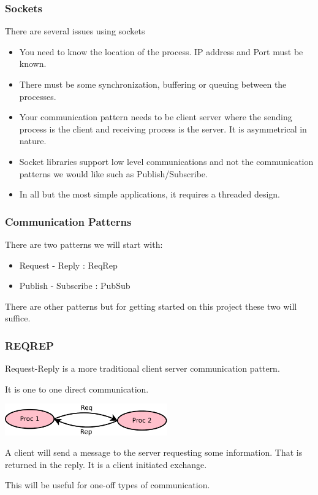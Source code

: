 \documentclass[xcolor=svgnames]{beamer}
\begin{document}
\begin{frame}[fragile]
\frametitle{Sockets}
  
There are several issues using sockets
\begin{itemize}
\item You need to know the location of the process. IP address and Port
must be known.  
\item There must be some synchronization, buffering or queuing between the processes.
\item Your communication pattern needs to be client server where the 
sending process is the client and receiving process is the server. 
It is asymmetrical in nature.
\item Socket libraries support low level communications and not the communication 
patterns we would like such as Publish/Subscribe.
\item In all but the most simple applications, it requires a threaded design.
\end{itemize} 

\end{frame}




\begin{frame}[fragile]
\frametitle{Communication Patterns}

There are two patterns we will start with:
\begin{itemize}
\item Request - Reply : ReqRep
\item Publish - Subscribe :  PubSub
\end{itemize}\vfill

There are other patterns but for getting started on this project
these two will suffice.

\end{frame}



\begin{frame}[fragile]
\frametitle{REQREP}


Request-Reply is a more traditional client server communication 
pattern. \vfill 

It is  one to one direct communication.
\vfill 
\begin{center}
\includegraphics[width=7cm]{./Image2.pdf}
\end{center}
\vfill
 A client will send a message to the server requesting 
some information.  That is returned in the reply.   It is a client
initiated exchange.\vfill

This will be useful for one-off types of communication.

\end{frame}
\end{document}

